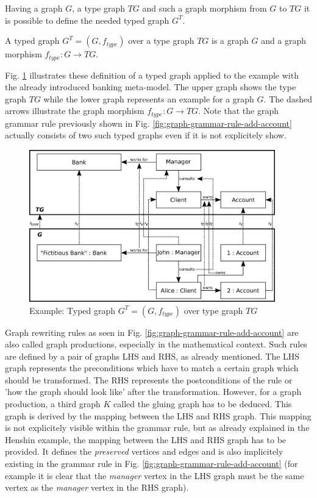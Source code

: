 \documentclass[runningheads]{llncs}
\begin{document}
\noindent
Having a graph $G$, a type graph $TG$ and such a graph morphism from $G$ to $TG$ it is possible to define the needed typed graph $G^T$.

\begin{definition}\label{typed-graph}
A typed graph $G^T = (G,f_{type})$ over a type graph $TG$ is a graph $G$ and a graph morphism $f_{type} : G \to TG$.
\end{definition}

\noindent
Fig. \ref{fig:example-graph-morphism} illustrates these definition of a typed graph applied to the example with the already introduced banking meta-model. The upper graph shows the type graph $TG$ while the lower graph represents an example for a graph $G$. The dashed arrows illustrate the graph morphism $f_{type} : G \to TG$. Note that the graph grammar rule previously shown in Fig. \ref{fig:graph-grammar-rule-add-account} actually consists of two such typed graphs even if it is not explicitely show.

\begin{figure}[H]
	\centering
	\includegraphics[width=0.95\textwidth]{example_graph_morphism}
	\caption{Example: Typed graph $G^T = (G,f_{type})$ over type graph $TG$}
	\label{fig:example-graph-morphism}
\end{figure}

\noindent
Graph rewriting rules as seen in Fig. \ref{fig:graph-grammar-rule-add-account} are also called graph productions, especially in the mathematical context. Such rules are defined by a pair of graphs LHS and RHS, as already mentioned. The LHS graph represents the preconditions which have to match a certain graph which should be transformed. The RHS represents the postconditions of the rule or 'how the graph should look like' after the transformation. However, for a graph production, a third graph $K$ called the gluing graph has to be deduced. This graph is derived by the mapping between the LHS and RHS graph. This mapping is not explicitely visible within the grammar rule, but as already explained in the Henshin example, the mapping between the LHS and RHS graph has to be provided. It defines the \textit{preserved} vertices and edges and is also implicitely 	existing in the grammar rule in Fig. \ref{fig:graph-grammar-rule-add-account} (for example it is clear that the \textit{manager} vertex in the LHS graph must be the same vertex as the \textit{manager} vertex in the RHS graph).
\end{document}
